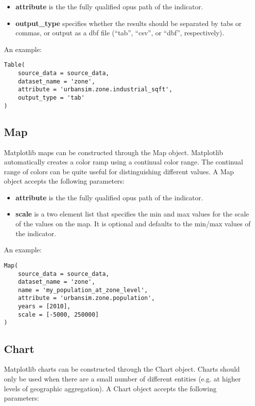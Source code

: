 \begin{itemize}
\tight
\item {\bf attribute} is the the fully qualified opus path of the indicator. 
\item {\bf output_type} specifies whether the results should be separated 
by tabs or commas, or output as a dbf file (``tab'', ``csv'', or ``dbf'', respectively).
\end{itemize}

An example:
\begin{verbatim}
Table(
    source_data = source_data,
    dataset_name = 'zone',
    attribute = 'urbansim.zone.industrial_sqft',
    output_type = 'tab'
) 
\end{verbatim}

\subsection{Map}

Matplotlib maps can be constructed through the Map object. 
Matplotlib automatically creates a color
ramp using a continual color range.  The continual range of colors can be
quite useful for distinguishing different values. 
A Map object accepts the following parameters:

\begin{itemize}
\tight
\item {\bf attribute} is the the fully qualified opus path of the indicator. 
\item {\bf scale} is a two element list that specifies the min and max values 
for the scale of the values on the map. It is optional and defaults to the
min/max values of the indicator. 
\end{itemize}
  
An example:
\begin{verbatim}
Map( 
    source_data = source_data,
    dataset_name = 'zone',
    name = 'my_population_at_zone_level',
    attribute = 'urbansim.zone.population',
    years = [2010], 
    scale = [-5000, 250000]
)
\end{verbatim}

\subsection{Chart}

Matplotlib charts can be constructed through the Chart object. 
Charts should only be used when there are a small number of different 
entities (e.g. at higher levels of geographic aggregation).
A Chart object accepts the following parameters:

